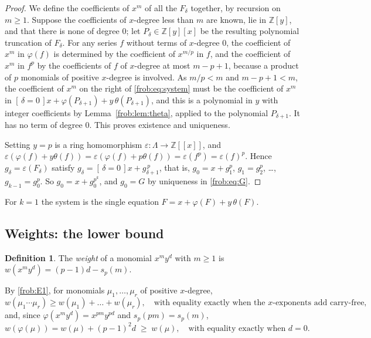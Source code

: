 \documentclass[11pt]{article}
\theoremstyle{definition}
\newtheorem{definition}[theorem]{Definition}
\theoremstyle{remark}
\numberwithin{equation}{section}
\numberwithin{figure}{section}
\newcommand{\Z}{\mathbb Z}
\newcommand{\br}[1]{[\,#1\,]}
\begin{document}
\begin{proof}
We define the coefficients of $x^m$ of all the $F_\delta$ together, by recursion on $m\ge1$.
Suppose the coefficients of $x$-degree less than $m$ are known, lie in $\Z[y]$, and that there
is none of degree $0$; let $P_\delta\in\Z[y][x]$ be the resulting polynomial truncation of
$F_\delta$. For any series $f$ without terms of $x$-degree $0$, the coefficient of $x^m$ in
$\varphi(f)$ is determined by the coefficient of $x^{m/p}$ in $f$, and the coefficient of
$x^m$ in $f^p$ by the coefficients of $f$ of $x$-degree at most $m-p+1$, because a product of
$p$ monomials of positive $x$-degree is involved. As $m/p<m$ and $m-p+1<m$, the coefficient
of $x^m$ on the right of \eqref{frob:eq:system} must be the coefficient of $x^m$ in
$\br{\delta=0}x+\varphi(P_{\delta+1})+y\,\theta(P_{\delta+1})$, and this is a polynomial in
$y$ with integer coefficients by Lemma~\ref{frob:lem:theta}, applied to the polynomial
$P_{\delta+1}$. It has no term of degree $0$. This proves existence and uniqueness.

Setting $y=p$ is a ring homomorphism $\varepsilon\colon\Lambda\to\Z[[x]]$, and
$\varepsilon(\varphi(f)+y\theta(f))=\varepsilon(\varphi(f)+p\theta(f))=\varepsilon(f^p)
=\varepsilon(f)^p$. Hence $g_\delta=\varepsilon(F_\delta)$ satisfy
$g_\delta=\br{\delta=0}x+g_{\delta+1}^{\,p}$, that is,
$g_0=x+g_1^p$, $g_1=g_2^p$, \dots, $g_{k-1}=g_0^p$. So $g_0=x+g_0^{p^k}$, and $g_0=G$ by
uniqueness in \eqref{frob:eq:G}.
\end{proof}

For $k=1$ the system is the single equation $F=x+\varphi(F)+y\,\theta(F)$.

\subsection{Weights: the lower bound}

\begin{definition}
The \emph{weight} of a monomial $x^my^d$ with $m\ge1$ is $w(x^my^d)=(p-1)d-s_p(m)$.
\end{definition}

By \ref{frob:E1}, for monomials $\mu_1,\dots,\mu_r$ of positive $x$-degree,
\begin{equation}\label{frob:eq:wprod}
 w(\mu_1\cdots\mu_r)\ge w(\mu_1)+\dots+w(\mu_r),\quad\text{with equality exactly when the
 $x$-exponents add carry-free,}
\end{equation}
and, since $\varphi(x^my^d)=x^{pm}y^{pd}$ and $s_p(pm)=s_p(m)$,
\begin{equation}\label{frob:eq:wphi}
 w(\varphi(\mu))=w(\mu)+(p-1)^2d\;\ge\;w(\mu),\quad\text{with equality exactly when }d=0.
\end{equation}
\end{document}
